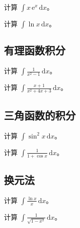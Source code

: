 \documentclass[answersection,pad]{kiritex}
\begin{document}
\begin{problem}
  计算 $\displaystyle\int x\,\mathrm{e}^{x}\,\mathrm{d}x$。
\end{problem}

\begin{problem}
  计算 $\displaystyle\int \ln x\,\mathrm{d}x$。
\end{problem}

\subsection{有理函数积分}

\begin{problem}
  计算 $\displaystyle\int \frac{1}{x^2-1}\,\mathrm{d}x$。
\end{problem}

\begin{problem}
  计算 $\displaystyle\int \frac{x+1}{x^2+4x+3}\,\mathrm{d}x$。
\end{problem}

\subsection{三角函数的积分}

\begin{problem}
  计算 $\displaystyle\int \sin^2 x\,\mathrm{d}x$。
\end{problem}

\begin{problem}
  计算 $\displaystyle\int \frac{1}{1+\cos x}\,\mathrm{d}x$。
\end{problem}

\subsection{换元法}

\begin{problem}
  计算 $\displaystyle\int \frac{\ln x}{x}\,\mathrm{d}x$。
\end{problem}

\begin{problem}
  计算 $\displaystyle\int \frac{1}{\sqrt{1-x^2}}\,\mathrm{d}x$。
\end{problem}
\end{document}
